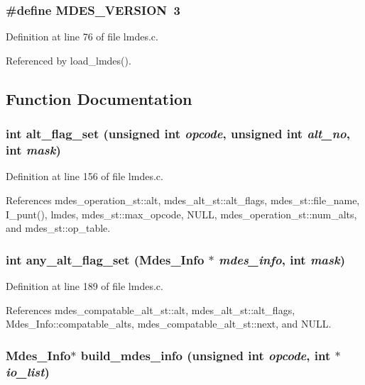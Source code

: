 \subsubsection{\setlength{\rightskip}{0pt plus 5cm}\#define MDES\_\-VERSION~3}\label{lmdes_8c_e92162ea5a88da4afa6f00925478830f}




Definition at line 76 of file lmdes.c.

Referenced by load\_\-lmdes().

\subsection{Function Documentation}
\subsubsection{\setlength{\rightskip}{0pt plus 5cm}int alt\_\-flag\_\-set (unsigned int {\em opcode}, unsigned int {\em alt\_\-no}, int {\em mask})}\label{lmdes_8c_8170398096fe078ee847319d5f380200}




Definition at line 156 of file lmdes.c.

References mdes\_\-operation\_\-st::alt, mdes\_\-alt\_\-st::alt\_\-flags, mdes\_\-st::file\_\-name, I\_\-punt(), lmdes, mdes\_\-st::max\_\-opcode, NULL, mdes\_\-operation\_\-st::num\_\-alts, and mdes\_\-st::op\_\-table.
\subsubsection{\setlength{\rightskip}{0pt plus 5cm}int any\_\-alt\_\-flag\_\-set (\bf{Mdes\_\-Info} $\ast$ {\em mdes\_\-info}, int {\em mask})}\label{lmdes_8c_9605b95ef76210011ca535870490cd9a}




Definition at line 189 of file lmdes.c.

References mdes\_\-compatable\_\-alt\_\-st::alt, mdes\_\-alt\_\-st::alt\_\-flags, Mdes\_\-Info::compatable\_\-alts, mdes\_\-compatable\_\-alt\_\-st::next, and NULL.
\subsubsection{\setlength{\rightskip}{0pt plus 5cm}\bf{Mdes\_\-Info}$\ast$ build\_\-mdes\_\-info (unsigned int {\em opcode}, int $\ast$ {\em io\_\-list})}\label{lmdes_8c_e14f6808b51ea8eeb57db97bb06a5fc3}





